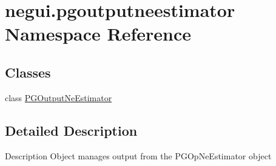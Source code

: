 \hypertarget{namespacenegui_1_1pgoutputneestimator}{}\section{negui.\+pgoutputneestimator Namespace Reference}
\label{namespacenegui_1_1pgoutputneestimator}
\subsection*{Classes}
\begin{DoxyCompactItemize}
\item 
class \hyperlink{classnegui_1_1pgoutputneestimator_1_1PGOutputNeEstimator}{P\+G\+Output\+Ne\+Estimator}
\end{DoxyCompactItemize}


\subsection{Detailed Description}
\begin{DoxyVerb}Description
Object manages output from the PGOpNeEstimator object\end{DoxyVerb}
 